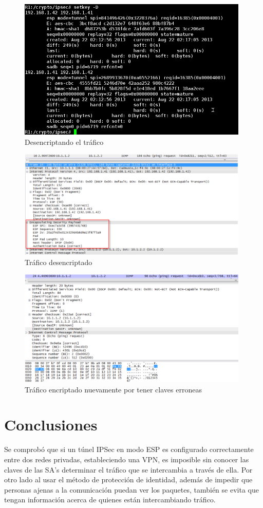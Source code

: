 \documentclass[a4paper,10pt]{article}
\begin{document}
		
	\begin{figure}[H]
		\centering
		\includegraphics[width=11cm]{Imagenes/setKey.png}
		\caption{Desencriptando el tr\'afico}\label{img029}
	\end{figure}	
	\begin{figure}[H]
		\centering
		\includegraphics[width=11cm]{Imagenes/desencriptacionICMP.png}
		\caption{Tr\'afico desencriptado}\label{img030}
	\end{figure}	
	\begin{figure}[H]
		\centering
		\includegraphics[width=11cm]{Imagenes/PingNoDesencriptado.png}
		\caption{Tr\'afico encriptado nuevamente por tener claves erroneas}\label{img031}
	\end{figure}	
		
		
	\newpage
	\section{Conclusiones}
	
	\indent Se comprobó que si un túnel IPSec en modo ESP es configurado correctamente entre dos redes privadas, estableciendo una VPN, es imposible sin conocer las claves de las SA’s determinar el tráfico que se intercambia
a través de ella. Por otro lado al usar el método de protección de identidad, además de impedir que personas ajenas a la comunicación puedan ver los paquetes, también se evita que tengan información acerca de quienes están intercambiando tráfico.
	


	
		
\end{document}
